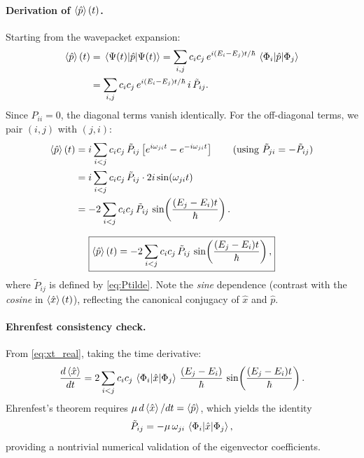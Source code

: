 \paragraph{Derivation of $\expval{\hat{p}}(t)$.}

Starting from the wavepacket expansion:
\begin{align}
  \expval{\hat{p}}(t)
  &= \mel{\Psi(t)}{\hat{p}}{\Psi(t)}
   = \sum_{i,j} c_i c_j\,e^{i(E_i - E_j)t/\hbar}\,\mel{\Phi_i}{\hat{p}}{\Phi_j}\notag\\
  &= \sum_{i,j} c_i c_j\,e^{i(E_i - E_j)t/\hbar}\,i\,\tilde{P}_{ij}.
\end{align}
Since $P_{ii} = 0$, the diagonal terms vanish identically.
For the off-diagonal terms, we pair $(i,j)$ with $(j,i)$:
\begin{align}
  \expval{\hat{p}}(t)
  &= i\sum_{i<j} c_i c_j\,\tilde{P}_{ij}\left[e^{i\omega_{ji}t} - e^{-i\omega_{ji}t}\right]
     \qquad\text{(using $\tilde{P}_{ji} = -\tilde{P}_{ij}$)}\notag\\
  &= i\sum_{i<j} c_i c_j\,\tilde{P}_{ij}\cdot 2i\sin(\omega_{ji}t)\notag\\
  &= -2\sum_{i<j} c_i c_j\,\tilde{P}_{ij}\,\sin\!\left(\frac{(E_j - E_i)t}{\hbar}\right).
\end{align}

\begin{result}\label{res:pexp}
\begin{equation}\label{eq:pexp}
  \boxed{
  \expval{\hat{p}}(t)
  = -2\sum_{i<j} c_i c_j\,\tilde{P}_{ij}\,\sin\!\left(\frac{(E_j - E_i)t}{\hbar}\right),
  }
\end{equation}
where $\tilde{P}_{ij}$ is defined by \cref{eq:Ptilde}.
Note the \emph{sine} dependence (contrast with the \emph{cosine} in $\expval{\hat{x}}(t)$), reflecting the canonical conjugacy of $\hat{x}$ and $\hat{p}$.
\end{result}

\paragraph{Ehrenfest consistency check.}

From \cref{eq:xt_real}, taking the time derivative:
\begin{equation}
  \frac{d\expval{\hat{x}}}{dt}
  = 2\sum_{i<j} c_i c_j\,\mel{\Phi_i}{\hat{x}}{\Phi_j}\,\frac{(E_j - E_i)}{\hbar}\,\sin\!\left(\frac{(E_j - E_i)t}{\hbar}\right).
\end{equation}
Ehrenfest's theorem requires $\mu\,d\expval{\hat{x}}/dt = \expval{\hat{p}}$, which yields the identity
\begin{equation}\label{eq:ehrenfest_check}
  \tilde{P}_{ij} = -\mu\,\omega_{ji}\,\mel{\Phi_i}{\hat{x}}{\Phi_j},
\end{equation}
providing a nontrivial numerical validation of the eigenvector coefficients.

